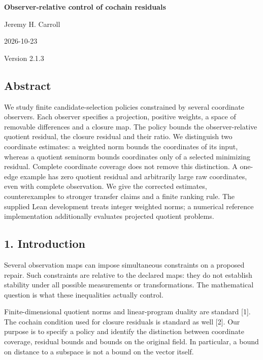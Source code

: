 \documentclass[
]{article}
\author{}
\date{}
\begin{document}
\begin{center}
{\LARGE\bfseries Observer-relative control of cochain residuals\par}
Jeremy H. Carroll\par
2026-10-23\par
Version 2.1.3\par
\end{center}

\subsection{Abstract}\label{abstract}

We study finite candidate-selection policies constrained by several
coordinate observers. Each observer specifies a projection, positive
weights, a space of removable differences and a closure map. The policy
bounds the observer-relative quotient residual, the closure residual and
their ratio. We distinguish two coordinate estimates: a weighted norm
bounds the coordinates of its input, whereas a quotient seminorm bounds
coordinates only of a selected minimizing residual. Complete coordinate
coverage does not remove this distinction. A one-edge example has zero
quotient residual and arbitrarily large raw coordinates, even with
complete observation. We give the corrected estimates, counterexamples
to stronger transfer claims and a finite ranking rule. The supplied Lean
development treats integer weighted norms; a numerical reference
implementation additionally evaluates projected quotient problems.

\subsection{1. Introduction}\label{introduction}

Several observation maps can impose simultaneous constraints on a
proposed repair. Such constraints are relative to the declared maps:
they do not establish stability under all possible measurements or
transformations. The mathematical question is what these inequalities
actually control.

Finite-dimensional quotient norms and linear-program duality are
standard {[}1{]}. The cochain condition used for closure residuals is
standard as well {[}2{]}. Our purpose is to specify a policy and
identify the distinction between coordinate coverage, residual bounds
and bounds on the original field. In particular, a bound on distance to
a subspace is not a bound on the vector itself.
\end{document}
